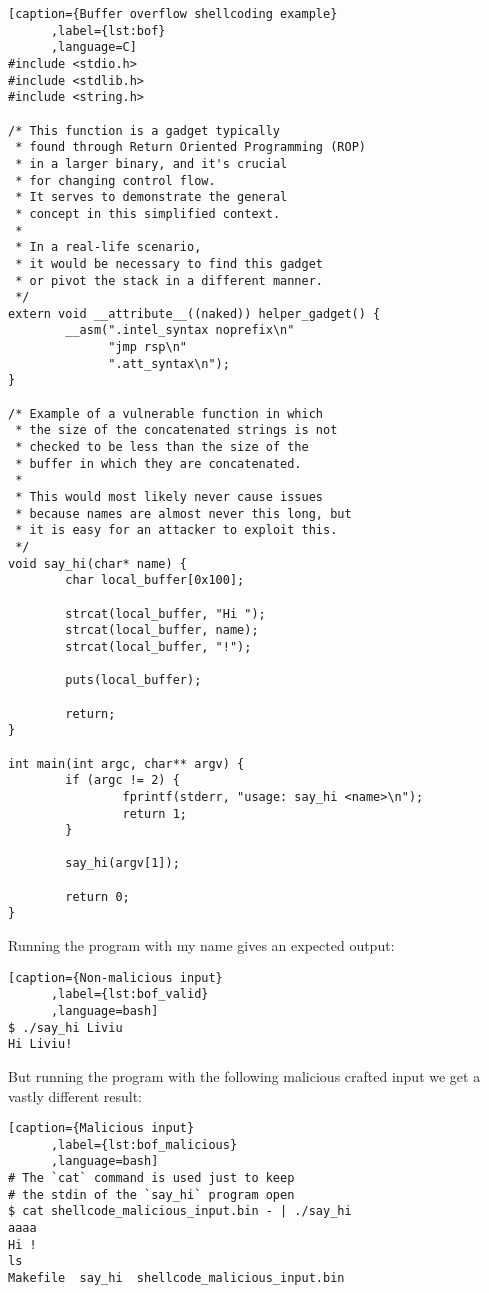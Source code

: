 \documentclass{article}
\begin{document}
\begin{minipage}{\linewidth}
\begin{lstlisting}[caption={Buffer overflow shellcoding example}
      ,label={lst:bof}
      ,language=C]
#include <stdio.h>
#include <stdlib.h>
#include <string.h>

/* This function is a gadget typically
 * found through Return Oriented Programming (ROP)
 * in a larger binary, and it's crucial
 * for changing control flow.
 * It serves to demonstrate the general
 * concept in this simplified context.
 *
 * In a real-life scenario,
 * it would be necessary to find this gadget
 * or pivot the stack in a different manner.
 */
extern void __attribute__((naked)) helper_gadget() {
        __asm(".intel_syntax noprefix\n"
              "jmp rsp\n"
              ".att_syntax\n");
}

/* Example of a vulnerable function in which
 * the size of the concatenated strings is not
 * checked to be less than the size of the
 * buffer in which they are concatenated.
 *
 * This would most likely never cause issues
 * because names are almost never this long, but
 * it is easy for an attacker to exploit this.
 */
void say_hi(char* name) {
        char local_buffer[0x100];

        strcat(local_buffer, "Hi ");
        strcat(local_buffer, name);
        strcat(local_buffer, "!");

        puts(local_buffer);

        return;
}

int main(int argc, char** argv) {
        if (argc != 2) {
                fprintf(stderr, "usage: say_hi <name>\n");
                return 1;
        }

        say_hi(argv[1]);

        return 0;
}
\end{lstlisting}
\end{minipage}

Running the program with my name gives an expected output:
\begin{lstlisting}[caption={Non-malicious input}
      ,label={lst:bof_valid}
      ,language=bash]
$ ./say_hi Liviu
Hi Liviu!
\end{lstlisting}

But running the program with the following malicious crafted input we get
a vastly different result:

\begin{lstlisting}[caption={Malicious input}
      ,label={lst:bof_malicious}
      ,language=bash]
# The `cat` command is used just to keep
# the stdin of the `say_hi` program open
$ cat shellcode_malicious_input.bin - | ./say_hi
aaaa
Hi !
ls
Makefile  say_hi  shellcode_malicious_input.bin
\end{lstlisting}
\end{document}
